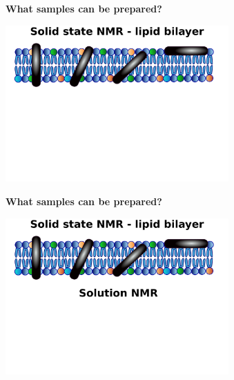 \documentclass{beamer}
\begin{document}
\addtocounter{framenumber}{-1}
\begin{frame}
\begin{center}
\Large{\centering
\textbf{What samples can be prepared?} \\}

\vspace{0.5cm}

\includegraphics[height=6cm]{plots/samples5.pdf}
\end{center}
\end{frame}

\addtocounter{framenumber}{-1}
\begin{frame}
\begin{center}
\Large{\centering
\textbf{What samples can be prepared?} \\}

\vspace{0.5cm}

\includegraphics[height=6cm]{plots/samples4.pdf}
\end{center}
\end{frame}
\end{document}
